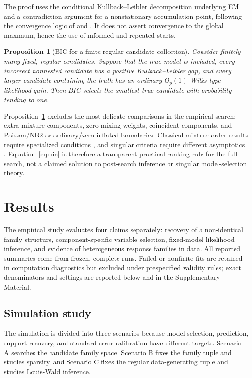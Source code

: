 \documentclass[a4paper,fleqn]{cas-sc}
\newtheorem{proposition}[theorem]{Proposition}
\begin{document}
The proof uses the conditional Kullback--Leibler decomposition underlying EM and a contradiction argument for a nonstationary accumulation point, following the convergence logic of \citet{dempster1977em} and \citet{wu1983convergence}. It does not assert convergence to the global maximum, hence the use of informed and repeated starts.

\begin{proposition}[BIC for a finite regular candidate collection]
\label{prop:bic}
Consider finitely many fixed, regular candidates. Suppose that the true model is included, every incorrect nonnested candidate has a positive Kullback--Leibler gap, and every larger candidate containing the truth has an ordinary $O_p(1)$ Wilks-type likelihood gain. Then BIC selects the smallest true candidate with probability tending to one.
\end{proposition}

Proposition~\ref{prop:bic} excludes the most delicate comparisons in the empirical search: extra mixture components, zero mixing weights, coincident components, and Poisson/NB2 or ordinary/zero-inflated boundaries. Classical mixture-order results require specialized conditions \citep{keribin2000order}, and singular criteria require different asymptotics \citep{drton2017sbic}. Equation~\eqref{eq:bic} is therefore a transparent practical ranking rule for the full search, not a claimed solution to post-search inference or singular model-selection theory.

\section{Results}
\label{sec:results}

The empirical study evaluates four claims separately: recovery of a non-identical family structure, component-specific variable selection, fixed-model likelihood inference, and evidence of heterogeneous response families in data. All reported summaries come from frozen, complete runs. Failed or nonfinite fits are retained in computation diagnostics but excluded under prespecified validity rules; exact denominators and settings are reported below and in the Supplementary Material.

\subsection{Simulation study}
\label{sec:simulation}

The simulation is divided into three scenarios because model selection, prediction, support recovery, and standard-error calibration have different targets. Scenario A searches the candidate family space, Scenario B fixes the family tuple and studies sparsity, and Scenario C fixes the regular data-generating tuple and studies Louis-Wald inference.
\end{document}
